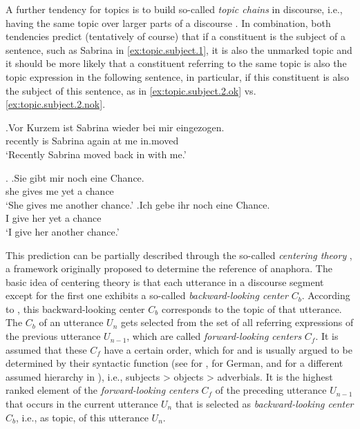 A further tendency for topics is to build so-called \textit{topic chains} in discourse, i.e., having the same topic over larger parts of a discourse \citep{givon1983}.
In combination, both tendencies predict (tentatively of course) that if a constituent is the subject of a sentence, such as Sabrina in \ref{ex:topic.subject.1}, it is also the unmarked topic and it should be more likely that a constituent referring to the same topic is also the topic expression in the following sentence, in particular, if this constituent is also the subject of this sentence, as in \ref{ex:topic.subject.2.ok} vs. \ref{ex:topic.subject.2.nok}.

\exg.\label{ex:topic.subject.1}{Vor Kurzem} ist Sabrina wieder bei mir eingezogen.\\
recently is Sabrina again at me in.moved\\
`Recently Sabrina moved back in with me.'

\ex.
\ag.\label{ex:topic.subject.2.ok}Sie gibt mir noch eine Chance.\\
she gives me yet a chance\\
`She gives me another chance.'
\bg.\label{ex:topic.subject.2.nok}Ich gebe ihr noch eine Chance.\\
I give her yet a chance\\
`I give her another chance.'

This prediction can be partially described through the so-called \textit{centering theory} \citep{grosz.etal1995, walker.etal1998}, a framework originally proposed to determine the reference of anaphora.
The basic idea of centering theory is that each utterance in a discourse segment except for the first one exhibits a so-called \textit{backward-looking center} $C_b$.
According to \citet[3]{walker.etal1998}, this backward-looking center $C_b$  corresponds to the topic of that utterance.
The $C_b$ of an utterance $U_n$ gets selected from the set of all referring expressions of the previous utterance $U_{n-1}$, which are called \textit{forward-looking centers} $C_f$.
It is assumed that these $C_f$ have a certain order, which for  and  is usually argued to be determined by their syntactic function (see \cite{walker.etal1998} for , \cite{speyer2007} for German,  and \cite{walker.etal1998} for a different assumed hierarchy in ), i.e., subjects > objects > adverbials.
It is the highest ranked element of the \textit{forward-looking centers} $C_f$ of the preceding utterance $U_{n-1}$ that occurs in the current utterance $U_n$ that is selected as \textit{backward-looking center} $C_b$, i.e., as topic, of this utterance $U_n$.

